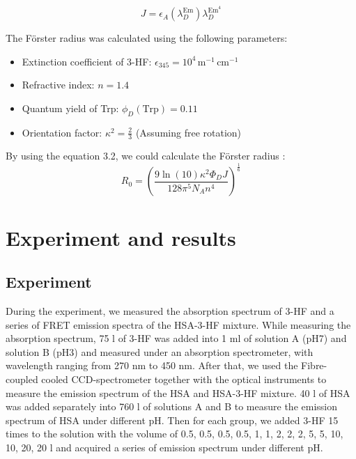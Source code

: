 \documentclass[a4paper,english,12pt,bibliography=totoc]{scrreprt}
\begin{document}
\begin{equation}
J = \epsilon_A(\lambda_D^{\text{Em}}) \lambda_D^{\text{Em}^4}
\end{equation}

The Förster radius was calculated using the following parameters:
\begin{itemize}
    \item Extinction coefficient of 3-HF: \(\epsilon_{345} = 10^4 \, \text{m}^{-1} \, \text{cm}^{-1}\)
    \item Refractive index: \(n = 1.4\)
    \item Quantum yield of Trp: \(\phi_D(\text{Trp}) = 0.11\)
    \item Orientation factor: \(\kappa^2 = \frac{2}{3}\) (Assuming free rotation)
\end{itemize}

By using the equation 3.2, we could calculate the Förster radius :
\begin{equation}
R_0 = \left( \frac{9 \ln(10) \kappa^2 \Phi_D J}{128 \pi^5 N_A n^4} \right)^{\frac{1}{6}}
\end{equation}



\chapter{Experiment and results}
\label{cha:Experiment}

\section{Experiment}
During the experiment, we measured the absorption spectrum of 3-HF and a series of FRET emission spectra of the HSA-3-HF mixture. While measuring the absorption spectrum, 75 \textmu l of 3-HF was added into 1 ml of solution A (pH7) and solution B (pH3) and measured under an absorption spectrometer, with wavelength ranging from 270 nm to 450 nm. After that, we used the Fibre-coupled cooled CCD-spectrometer together with the optical instruments to measure the emission spectrum of the HSA and HSA-3-HF mixture. 40 \textmu l of HSA was added separately into 760 \textmu l of solutions A and B to measure the emission spectrum of HSA under different pH. Then for each group, we added 3-HF 15 times to the solution with the volume of 0.5, 0.5, 0.5, 0.5, 1, 1, 2, 2, 2, 5, 5, 10, 10, 20, 20 \textmu l and acquired a series of emission spectrum under different pH.
\end{document}
